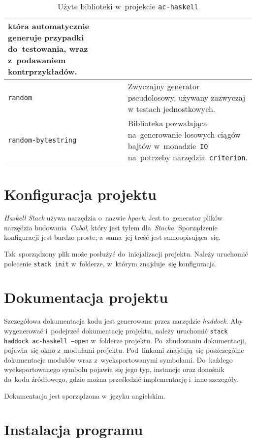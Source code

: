 \documentclass[../../praca.tex]{subfiles}
\begin{document}
\begin{table}
\begin{tabular}{|l|p{8cm}|}
                                  która automatycznie generuje przypadki do~testowania, wraz z~podawaniem kontrprzykładów. \\ \hline
    \texttt{random}             & Zwyczajny generator pseudolosowy, używany 
                                  zazwyczaj w testach jednostkowych. \\ \hline
    \texttt{random-bytestring}  & Biblioteka pozwalająca na~generowanie losowych ciągów bajtów
                                  w~monadzie~\texttt{IO} na~potrzeby narzędzia~\texttt{criterion}. \\ \hline
  \end{tabular}
  \caption{Użyte biblioteki w~projekcie \texttt{ac-haskell}}
  \label{tab:libs}
\end{table}

\section{Konfiguracja projektu}

\emph{Haskell Stack} używa narzędzia o~nazwie \emph{hpack}. 
Jest to~generator plików narzędzia budowania~\emph{Cabal},
który jest tyłem dla~\emph{Stacka}. Sporządzenie konfiguracji
jest bardzo proste, a~sama~jej treść jest samoopisująca~się.


Tak~sporządzony plik może posłużyć do~inicjalizacji projektu.
Należy uruchomić polecenie \texttt{stack init} w~folderze,
w~którym znajduje~się konfiguracja.

\section{Dokumentacja projektu}

Szczegółowa dokumentacja kodu jest generowana przez narzędzie \emph{haddock}.
Aby wygenerować i~podejrzeć dokumentację projektu, należy uruchomić \texttt{stack haddock
ac-haskell --open} w~folderze projektu. Po~zbudowaniu dokumentacji, pojawia~się
okno z~modułami projektu. Pod~linkami znajdują~się poszczególne dokumentacje
modułów wraz z~wyeksportowanymi symbolami. Do~każdego wyeksportowanego
symbolu pojawia się jego typ, instancje oraz donośnik do~kodu źródłowego,
gdzie można prześledzić implementację i~inne szczegóły.

Dokumentacja jest sporządzona w~języku angielskim.

\section{Instalacja programu}
\end{document}
